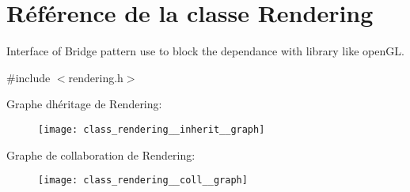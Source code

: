\hypertarget{class_rendering}{}\section{Référence de la classe Rendering}
\label{class_rendering}


Interface of Bridge pattern use to block the dependance with library like open\+GL.  




{\ttfamily \#include $<$rendering.\+h$>$}



Graphe d\textquotesingle{}héritage de Rendering\+:
\nopagebreak
\begin{figure}[H]
\begin{center}
\leavevmode
\texttt{[image: class\_rendering\_\_inherit\_\_graph]}
\end{center}
\end{figure}


Graphe de collaboration de Rendering\+:
\nopagebreak
\begin{figure}[H]
\begin{center}
\leavevmode
\texttt{[image: class\_rendering\_\_coll\_\_graph]}
\end{center}
\end{figure}

